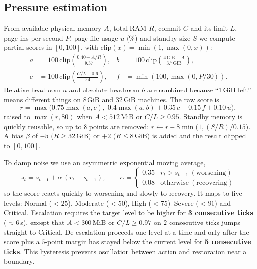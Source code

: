 \documentclass[11pt]{article}
\begin{document}
\subsection{Pressure estimation}
\label{sec:pressure}
From available physical memory $A$, total RAM $R$, commit $C$ and its limit $L$, page-ins per second $P$, page-file usage $u$ (\%) and standby size $S$ we compute partial scores in $[0,100]$, with $\mathrm{clip}(x)=\min(1,\max(0,x))$:
\begin{align}
a &= 100\,\mathrm{clip}\!\left(\frac{0.40 - A/R}{0.37}\right), &
b &= 100\,\mathrm{clip}\!\left(\frac{4\,\mathrm{GiB} - A}{3.7\,\mathrm{GiB}}\right), \nonumber\\
c &= 100\,\mathrm{clip}\!\left(\frac{C/L - 0.6}{0.4}\right), &
f &= \min\!\left(100, \max\!\left(0, P/30\right)\right).
\end{align}
Relative headroom $a$ and absolute headroom $b$ are combined because ``1\,GiB left'' means different things on 8\,GiB and 32\,GiB machines. The raw score is
\begin{equation}
r = \max\!\bigl(0.75\max(a,c),\; 0.4\max(a,b) + 0.35\,c + 0.15\,f + 0.10\,u\bigr),
\end{equation}
raised to $\max(r,80)$ when $A<512$\,MiB or $C/L\ge0.95$. Standby memory is quickly reusable, so up to 8 points are removed: $r \leftarrow r - 8\min\!\bigl(1, (S/R)/0.15\bigr)$. A bias $\beta$ of $-5$ ($R\ge32$\,GiB) or $+2$ ($R\le8$\,GiB) is added and the result clipped to $[0,100]$.

To damp noise we use an asymmetric exponential moving average,
\begin{equation}
s_t = s_{t-1} + \alpha\,(r_t - s_{t-1}),\qquad
\alpha = \begin{cases} 0.35 & r_t > s_{t-1}\ (\text{worsening}) \\ 0.08 & \text{otherwise}\ (\text{recovering}) \end{cases}
\end{equation}
so the score reacts quickly to worsening and slowly to recovery. It maps to five levels: Normal ($<25$), Moderate ($<50$), High ($<75$), Severe ($<90$) and Critical. Escalation requires the target level to be higher for \textbf{3 consecutive ticks} ($\approx$6\,s), except that $A<300$\,MiB or $C/L\ge0.97$ on 2 consecutive ticks jumps straight to Critical. De-escalation proceeds one level at a time and only after the score plus a 5-point margin has stayed below the current level for \textbf{5 consecutive ticks}. This hysteresis prevents oscillation between action and restoration near a boundary.
\end{document}
